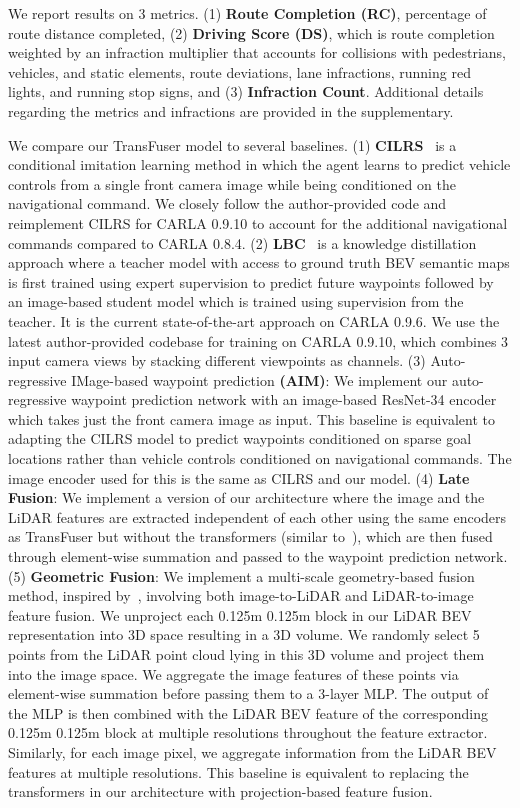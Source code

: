\documentclass[final]{cvpr}
\newcommand{\boldparagraph}[1]{\vspace{0.1cm}\noindent{\bf #1:}}
\begin{document}
\boldparagraph{Metrics} We report results on 3 metrics. (1) \textbf{Route Completion (RC)}, percentage of route distance completed, (2) \textbf{Driving Score (DS)}, which is route completion weighted by an infraction multiplier that accounts for collisions with pedestrians, vehicles, and static elements, route deviations, lane infractions, running red lights, and running stop signs, and (3) \textbf{Infraction Count}. Additional details regarding the metrics and infractions are provided in the supplementary.

\boldparagraph{Baselines} We compare our TransFuser model to several baselines. (1) \textbf{CILRS}~\cite{Codevilla2019ICCV} is a conditional imitation learning method in which the agent learns to predict vehicle controls from a single front camera image while being conditioned on the navigational command. We closely follow the author-provided code and reimplement CILRS for CARLA 0.9.10 to account for the additional navigational commands compared to CARLA 0.8.4. (2) \textbf{LBC}~\cite{Chen2019CORL} is a knowledge distillation approach where a teacher model with access to ground truth BEV semantic maps is first trained using expert supervision to predict future waypoints followed by an image-based student model which is trained using supervision from the teacher. It is the current state-of-the-art approach on CARLA 0.9.6. We use the latest author-provided codebase for training on CARLA 0.9.10, which combines 3 input camera views by stacking different viewpoints as channels. (3) Auto-regressive IMage-based waypoint prediction \textbf{(AIM)}: We implement our auto-regressive waypoint prediction network with an image-based ResNet-34 encoder which takes just the front camera image as input. This baseline is equivalent to adapting the CILRS model to predict waypoints conditioned on sparse goal locations rather than vehicle controls conditioned on navigational commands. The image encoder used for this is the same as CILRS and our model. (4) \textbf{Late Fusion}: We implement a version of our architecture where the image and the LiDAR features are extracted independent of each other using the same encoders as TransFuser but without the transformers (similar to~\cite{Sobh2018NEURIPSW}), which are then fused through element-wise summation and passed to the waypoint prediction network. (5) \textbf{Geometric Fusion}: We implement a multi-scale geometry-based fusion method, inspired by~\cite{Liang2018ECCV, Liang2019CVPR}, involving both image-to-LiDAR and LiDAR-to-image feature fusion. We unproject each 0.125m  0.125m block in our LiDAR BEV representation into 3D space resulting in a 3D volume. We randomly select 5 points from the LiDAR point cloud lying in this 3D volume and project them into the image space. We aggregate the image features of these points via element-wise summation before passing them to a 3-layer MLP. The output of the MLP is then combined with the LiDAR BEV feature of the corresponding 0.125m  0.125m block at multiple resolutions throughout the feature extractor. Similarly, for each image pixel, we aggregate information from the LiDAR BEV features at multiple resolutions. This baseline is equivalent to replacing the transformers in our architecture with projection-based feature fusion.
\end{document}

